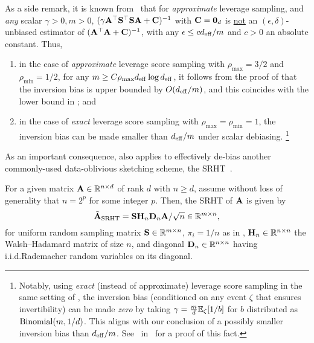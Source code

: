 \documentclass[11pt,a4paper]{article}
\begin{document}
As a side remark, it is known from~\citet[Theorem~10]{derezinski2021sparse} that for \emph{approximate} leverage sampling, and \emph{any} scalar $\gamma > 0, m > 0$,  $(\gamma \A^\top \S^\top \S \A + \C)^{-1}$ with $\C=\zo_d$ is \underline{not} an $(\epsilon, \delta)$-unbiased estimator of $(\A^\top \A + \C)^{-1}$, with any $\epsilon \leq c d_{\eff}/m$ and  $c > 0$ an  absolute constant. 
Thus, 
\begin{enumerate}%
  \item in the case of \emph{approximate} leverage score sampling with $\rho_{\max}=3/2$ and $\rho_{\min}=1/2$, for any $m\geq C\rho_{\max} d_{\eff} \log d_{\eff}$, it follows from the proof of  that the inversion bias is upper bounded by $O(d_{\eff}/m)$, and this coincides with the lower bound in \citet[Theorem~10]{derezinski2021sparse}; 
  and 
  \item in the case of \emph{exact} leverage score sampling with $\rho_{\max}=\rho_{\min} =1$, the inversion bias can be made smaller than $d_{\eff}/m$ under scalar debiasing.%
  \footnote{Notably, using \emph{exact} (instead of approximate) leverage score sampling in the same setting of \citet[Theorem~10]{derezinski2021sparse}, the inversion bias (conditioned on any event $\zeta$ that ensures invertibility) can be made \emph{zero} by taking $\gamma = \frac{m}{d}\EE_{\zeta}[1/b]$ for $b$ distributed as ${\rm Binomial}(m, 1/d)$.
  This aligns with our conclusion of a possibly smaller inversion bias than $d_{\eff}/m$. See~ in~ for a proof of this fact.}
\end{enumerate}



As an important consequence,  also applies to effectively de-bias another commonly-used data-oblivious sketching scheme, the SRHT~\citep{ailon2006approximate}. 

\begin{definition}\label{def:srht}
For a given matrix $\A \in \RR^{n \times d}$ of rank $d$ with $n \geq d$, assume without loss of generality that $n = 2^p$ for some integer $p$.
Then, the SRHT of $\A$ is given by
\begin{equation}
  \tilde{\A}_{\rm SRHT} = \S \H_n \D_n \A/\sqrt n \in \RR^{m \times n},
\end{equation}
for uniform random sampling matrix $\S \in \mathbb{R}^{m \times n}$, $\pi_i = 1/n$ as in , $\H_{n} \in \mathbb{R}^{n \times n}$ the Walsh--Hadamard matrix of size $n$, and diagonal $\D_n \in \RR^{n \times n}$ having i.i.d.\@ Rademacher random variables on its diagonal.
\end{definition}
\end{document}
